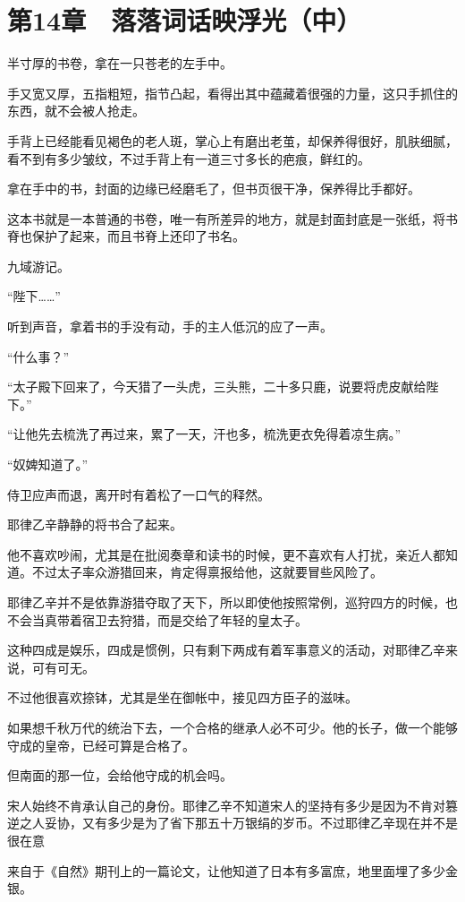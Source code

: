 \section{第14章　落落词话映浮光（中）}

半寸厚的书卷，拿在一只苍老的左手中。

手又宽又厚，五指粗短，指节凸起，看得出其中蕴藏着很强的力量，这只手抓住的东西，就不会被人抢走。

手背上已经能看见褐色的老人斑，掌心上有磨出老茧，却保养得很好，肌肤细腻，看不到有多少皱纹，不过手背上有一道三寸多长的疤痕，鲜红的。

拿在手中的书，封面的边缘已经磨毛了，但书页很干净，保养得比手都好。

这本书就是一本普通的书卷，唯一有所差异的地方，就是封面封底是一张纸，将书脊也保护了起来，而且书脊上还印了书名。

九域游记。

“陛下……”

听到声音，拿着书的手没有动，手的主人低沉的应了一声。

“什么事？”

“太子殿下回来了，今天猎了一头虎，三头熊，二十多只鹿，说要将虎皮献给陛下。”

“让他先去梳洗了再过来，累了一天，汗也多，梳洗更衣免得着凉生病。”

“奴婢知道了。”

侍卫应声而退，离开时有着松了一口气的释然。

耶律乙辛静静的将书合了起来。

他不喜欢吵闹，尤其是在批阅奏章和读书的时候，更不喜欢有人打扰，亲近人都知道。不过太子率众游猎回来，肯定得禀报给他，这就要冒些风险了。

耶律乙辛并不是依靠游猎夺取了天下，所以即使他按照常例，巡狩四方的时候，也不会当真带着宿卫去狩猎，而是交给了年轻的皇太子。

这种四成是娱乐，四成是惯例，只有剩下两成有着军事意义的活动，对耶律乙辛来说，可有可无。

不过他很喜欢捺钵，尤其是坐在御帐中，接见四方臣子的滋味。

如果想千秋万代的统治下去，一个合格的继承人必不可少。他的长子，做一个能够守成的皇帝，已经可算是合格了。

但南面的那一位，会给他守成的机会吗。

宋人始终不肯承认自己的身份。耶律乙辛不知道宋人的坚持有多少是因为不肯对篡逆之人妥协，又有多少是为了省下那五十万银绢的岁币。不过耶律乙辛现在并不是很在意

来自于《自然》期刊上的一篇论文，让他知道了日本有多富庶，地里面埋了多少金银。

